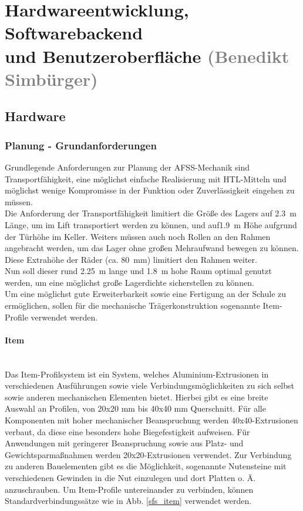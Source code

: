 \section{Hardwareentwicklung, Softwarebackend \\ und Benutzeroberfläche \textcolor{gray}{(Benedikt Simbürger)}}

\subsection{Hardware}

\subsubsection{Planung - Grundanforderungen} 
Grundlegende Anforderungen zur Planung der AFSS-Mechanik sind Transportfähigkeit, eine möglichst einfache Realisierung mit HTL-Mitteln und möglichst wenige Kompromisse in der Funktion oder Zuverlässigkeit eingehen zu müssen.\\
Die Anforderung der Transportfähigkeit limitiert die Größe des Lagers auf \SI{2.3}{\meter} Länge, um im Lift transportiert werden zu können, und auf\SI{1.9}{\meter} Höhe aufgrund der Türhöhe im Keller. Weiters müssen auch noch Rollen an den Rahmen angebracht werden, um das Lager ohne großen Mehraufwand bewegen zu können. Diese Extrahöhe der Räder (ca. \SI{80}{\mm}) limitiert den Rahmen weiter.\\
Nun soll dieser rund \SI{2.25}{\meter} lange und \SI{1.8}{\meter} hohe Raum optimal genutzt werden, um eine möglichst große Lagerdichte sicherstellen zu können.\\
Um eine möglichst gute Erweiterbarkeit sowie eine Fertigung an der Schule zu ermöglichen, sollen für die mechanische Trägerkonstruktion sogenannte Item-Profile verwendet werden.



\paragraph{Item}\mbox{}\\
Das Item-Profilsystem ist ein System, welches Aluminium-Extrusionen in verschiedenen Ausführungen sowie viele Verbindungsmöglichkeiten zu sich selbst sowie anderen mechanischen Elementen bietet. Hierbei gibt es eine breite Auswahl an Profilen, von 20x20 mm bis 40x40 mm Querschnitt. Für alle Komponenten mit hoher mechanischer Beanspruchung werden 40x40-Extrusionen verbaut, da diese eine besonders hohe Biegefestigkeit aufweisen. Für Anwendungen mit geringerer Beanspruchung sowie aus Platz- und Gewichtsparmaßnahmen werden 20x20-Extrusionen verwendet.
Zur Verbindung zu anderen Bauelementen gibt es die Möglichkeit, sogenannte Nutensteine mit verschiedenen Gewinden in die Nut einzulegen und dort Platten o. Ä. anzuschrauben. Um Item-Profile untereinander zu verbinden, können Standardverbindungssätze wie in Abb. \ref{sfs_item} verwendet werden.\\

